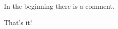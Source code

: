 \documentclass{article}
\begin{document}
In the beginning there is a comment.
\begin{comment}
Comment should not appear in the PDF, it should be artifact.
\end{comment}
\begin{smalltt}
That's it!
\end{smalltt}
\end{document}
